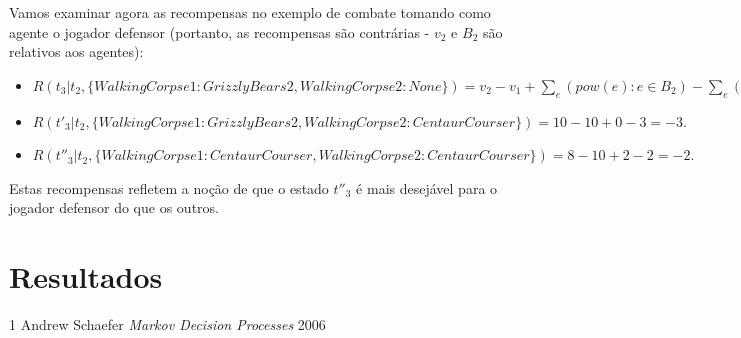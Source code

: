 \documentclass{book}
\begin{document}
\begin{itemize}
Vamos examinar agora as recompensas no exemplo de combate tomando como agente o jogador defensor (portanto, as recompensas são contrárias - $v_2$ e $B_2$ são relativos aos agentes):

\begin{itemize}
  \item $R(t_3 | t_2, \{WalkingCorpse1 : GrizzlyBears2, WalkingCorpse2 : None\}) = v_2 - v_1 + \sum\limits_e(pow(e) : e \in B_2) - \sum\limits_e(pow(e) : e \in B_1) = 7 - 10 + 2 - 5 = -6.$
  \item $R(t'_3| t_2, \{WalkingCorpse1 : GrizzlyBears2, WalkingCorpse2 : CentaurCourser\}) = 10 - 10 + 0 - 3 = -3.$
  \item $R(t''_3| t_2, \{WalkingCorpse1 : CentaurCourser, WalkingCorpse2 : CentaurCourser\}) = 8 - 10 + 2 - 2 = -2.$
\end{itemize}
Estas recompensas refletem a noção de que o estado $t''_3$ é mais desejável para o jogador defensor do que os outros.

\end{itemize}

\chapter{Resultados}

\begin{thebibliography}{1}
  Andrew Schaefer {\em Markov Decision Processes} 2006
\end{thebibliography}
\end{document}
